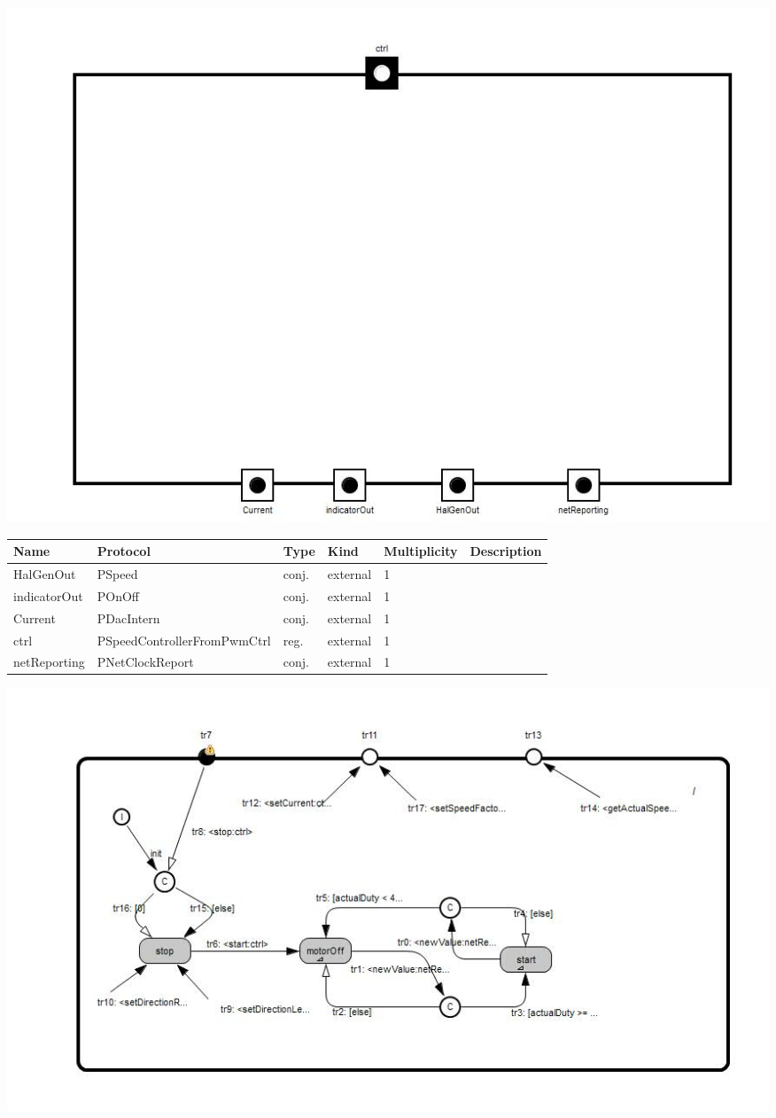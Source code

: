 
{
\centering{}
\includegraphics[width=1.0\textwidth]{./images/ASpeedControllerFromTriacTrigger_structure.jpg}
}

\begin{tabular}[ht]{|l|l|l|l|l|p{5cm}|}
\hline
\textbf{Name} & \textbf{Protocol} & \textbf{Type} & \textbf{Kind} & \textbf{Multiplicity} & \textbf{Description}\\
\hline
HalGenOut & PSpeed & conj. & external & 1 & \\
\hline
indicatorOut & POnOff & conj. & external & 1 & \\
\hline
Current & PDacIntern & conj. & external & 1 & \\
\hline
ctrl & PSpeedControllerFromPwmCtrl & reg. & external & 1 & \\
\hline
netReporting & PNetClockReport & conj. & external & 1 & \\
\hline
\end{tabular}

{
\centering{}
\includegraphics[width=1.0\textwidth]{./images/ASpeedControllerFromTriacTrigger_behavior.jpg}
}

